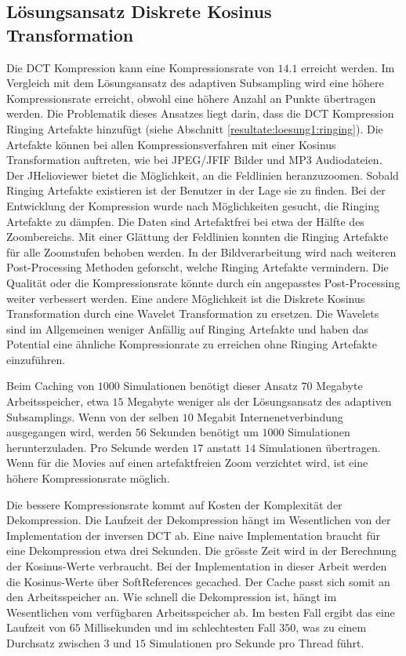 \subsection{Lösungsansatz Diskrete Kosinus Transformation}
Die DCT Kompression kann eine Kompressionsrate von $14.1$ erreicht werden. Im Vergleich mit dem Lösungsansatz des adaptiven Subsampling wird eine höhere Kompressionsrate erreicht, obwohl eine höhere Anzahl an Punkte übertragen werden. Die Problematik dieses Ansatzes liegt darin, dass die DCT Kompression Ringing Artefakte hinzufügt (siehe Abschnitt \ref{resultate:loesung1:ringing}). Die Artefakte können bei allen Kompressionsverfahren mit einer Kosinus Transformation auftreten, wie bei JPEG/JFIF Bilder und MP3 Audiodateien. Der JHelioviewer bietet die Möglichkeit, an die Feldlinien heranzuzoomen. Sobald Ringing Artefakte existieren ist der Benutzer in der Lage sie zu finden. Bei der Entwicklung der Kompression wurde nach Möglichkeiten gesucht, die Ringing Artefakte zu dämpfen. Die Daten sind Artefaktfrei bei etwa der Hälfte des Zoombereichs. Mit einer Glättung der Feldlinien konnten die Ringing Artefakte für alle Zoomstufen behoben werden. In der Bildverarbeitung wird nach weiteren Post-Processing Methoden geforscht, welche Ringing Artefakte vermindern. Die Qualität oder die Kompressionsrate könnte durch ein angepasstes Post-Processing weiter verbessert werden. Eine andere Möglichkeit ist die Diskrete Kosinus Transformation durch eine Wavelet Transformation zu ersetzen. Die Wavelets sind im Allgemeinen weniger Anfällig auf Ringing Artefakte und haben das Potential eine ähnliche Kompressionrate zu erreichen ohne Ringing Artefakte einzuführen.

Beim Caching von $1000$ Simulationen benötigt dieser Ansatz $70$ Megabyte Arbeitsspeicher, etwa $15$ Megabyte weniger als der Lösungsansatz des adaptiven Subsamplings. Wenn von der selben $10$ Megabit Internenetverbindung ausgegangen wird, werden $56$ Sekunden benötigt um $1000$ Simulationen herunterzuladen. Pro Sekunde werden $17$ anstatt $14$ Simulationen übertragen. Wenn für die Movies auf einen artefaktfreien Zoom verzichtet wird, ist eine höhere Kompressionsrate möglich.

Die bessere Kompressionsrate kommt auf Kosten der Komplexität der Dekompression. Die Laufzeit der Dekompression hängt im Wesentlichen von der Implementation der inversen DCT ab. Eine naive Implementation braucht für eine Dekompression etwa drei Sekunden. Die grösste Zeit wird in der Berechnung der Kosinus-Werte verbraucht. Bei der Implementation in dieser Arbeit werden die Kosinus-Werte über SoftReferences gecached. Der Cache passt sich somit an den Arbeitsspeicher an. Wie schnell die Dekompression ist, hängt im Wesentlichen vom verfügbaren Arbeitsspeicher ab. Im besten Fall ergibt das eine Laufzeit von $65$ Millisekunden und im schlechtesten Fall $350$, was zu einem Durchsatz zwischen $3$ und $15$ Simulationen pro Sekunde pro Thread führt.

